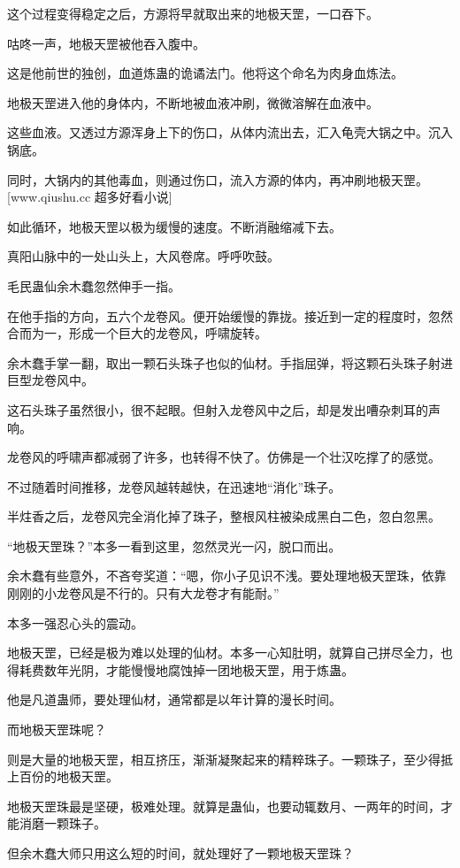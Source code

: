\begin{this_body}
这个过程变得稳定之后，方源将早就取出来的地极天罡，一口吞下。

咕咚一声，地极天罡被他吞入腹中。

这是他前世的独创，血道炼蛊的诡谲法门。他将这个命名为肉身血炼法。

地极天罡进入他的身体内，不断地被血液冲刷，微微溶解在血液中。

这些血液。又透过方源浑身上下的伤口，从体内流出去，汇入龟壳大锅之中。沉入锅底。

同时，大锅内的其他毒血，则通过伤口，流入方源的体内，再冲刷地极天罡。[www.qiushu.cc 超多好看小说]

如此循环，地极天罡以极为缓慢的速度。不断消融缩减下去。

真阳山脉中的一处山头上，大风卷席。呼呼吹鼓。

毛民蛊仙余木蠢忽然伸手一指。

在他手指的方向，五六个龙卷风。便开始缓慢的靠拢。接近到一定的程度时，忽然合而为一，形成一个巨大的龙卷风，呼啸旋转。

余木蠢手掌一翻，取出一颗石头珠子也似的仙材。手指屈弹，将这颗石头珠子射进巨型龙卷风中。

这石头珠子虽然很小，很不起眼。但射入龙卷风中之后，却是发出嘈杂刺耳的声响。

龙卷风的呼啸声都减弱了许多，也转得不快了。仿佛是一个壮汉吃撑了的感觉。

不过随着时间推移，龙卷风越转越快，在迅速地“消化”珠子。

半炷香之后，龙卷风完全消化掉了珠子，整根风柱被染成黑白二色，忽白忽黑。

“地极天罡珠？”本多一看到这里，忽然灵光一闪，脱口而出。

余木蠢有些意外，不吝夸奖道：“嗯，你小子见识不浅。要处理地极天罡珠，依靠刚刚的小龙卷风是不行的。只有大龙卷才有能耐。”

本多一强忍心头的震动。

地极天罡，已经是极为难以处理的仙材。本多一心知肚明，就算自己拼尽全力，也得耗费数年光阴，才能慢慢地腐蚀掉一团地极天罡，用于炼蛊。

他是凡道蛊师，要处理仙材，通常都是以年计算的漫长时间。

而地极天罡珠呢？

则是大量的地极天罡，相互挤压，渐渐凝聚起来的精粹珠子。一颗珠子，至少得抵上百份的地极天罡。

地极天罡珠最是坚硬，极难处理。就算是蛊仙，也要动辄数月、一两年的时间，才能消磨一颗珠子。

但余木蠢大师只用这么短的时间，就处理好了一颗地极天罡珠？


\end{this_body}
